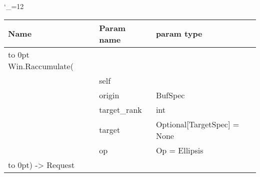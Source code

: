 \begingroup \catcode`\_=12 \tt
\begin{tabular}{lll}
\toprule
\textrm{Name}&\textrm{Param name}&\textrm{param type}\\
\midrule
\hbox to 0pt {Win.Raccumulate(\hss}\\
& self\\
& origin & BufSpec\\
& target_rank & int\\
& target & Optional[TargetSpec] = None\\
& op & Op = Ellipsis\\
\hbox to 0pt{) -> Request\hss}\\
\bottomrule
\end{tabular}
\endgroup
